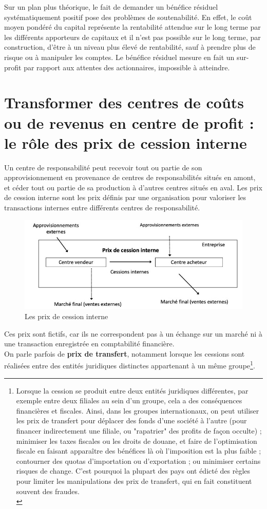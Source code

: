 \documentclass{kaobook}
\begin{document}
Sur un plan plus théorique, le fait de demander un bénéfice résiduel systématiquement positif pose des problèmes de soutenabilité. En effet, le coût moyen pondéré du capital représente la rentabilité attendue sur le long terme par les différents apporteurs de capitaux et il n'est pas possible sur le long terme, par construction, d'être à un niveau plus élevé de rentabilité, sauf à prendre plus de risque ou à manipuler les comptes. Le bénéfice résiduel mesure en fait un sur-profit par rapport aux attentes des actionnaires, impossible à atteindre.\\

\section{Transformer des centres de coûts ou de revenus en centre de profit : le rôle des prix de cession interne}
\label{sec:orgc8e956b}
Un centre de responsabilité peut recevoir tout ou partie de son approvisionnement en provenance de centres de responsabilités situés en amont, et céder tout ou partie de sa production à d’autres centres situés en aval. Les prix de cession interne sont les prix définis par une organisation pour valoriser les transactions internes entre différents centres de responsabilité.\\
\begin{figure}[htbp]
\centering
\includegraphics[width=.9\linewidth]{./img/pci.jpeg}
\caption{Les prix de cession interne}
\end{figure}
Ces prix sont fictifs, car ils ne correspondent pas à un échange sur un marché ni à une transaction enregistrée en comptabilité financière.\\

On parle parfois de \textbf{prix de transfert}, notamment lorsque les cessions sont réalisées entre des entités juridiques distinctes appartenant à un même groupe\footnote{Lorsque la cession se produit entre deux entités juridiques différentes, par exemple entre deux filiales au sein d’un groupe, cela a des conséquences financières et fiscales. Ainsi, dans les groupes internationaux, on peut utiliser les prix de transfert pour déplacer des fonds d’une société à l’autre (pour financer indirectement une filiale, ou "rapatrier" des profits de façon occulte) ; minimiser les taxes fiscales ou les droits de douane, et faire de l’optimisation fiscale en faisant apparaître des bénéfices là où l’imposition est la plus faible ; contourner des quotas d’importation ou d’exportation ; ou minimiser certains risques de change. C’est pourquoi la plupart des pays ont édicté des règles pour limiter les manipulations des prix de transfert, qui en fait constituent souvent des fraudes.\\}.\\
\end{document}
